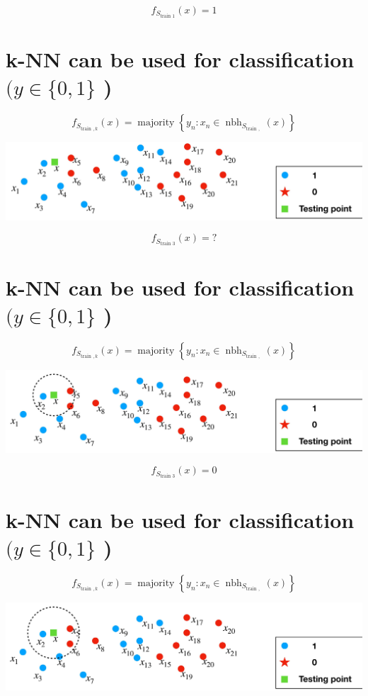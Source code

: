 \documentclass[10pt]{article}
\begin{document}
$$
f_{S_{\text {train } 1}}(x)=1
$$

\section*{k-NN can be used for classification $(y \in\{0,1\}$ )}
$$
f_{S_{\text {train }, k}}(x)=\operatorname{majority}\left\{y_{n}: x_{n} \in \operatorname{nbh}_{S_{\text {train }, ~}}(x)\right\}
$$

\begin{center}
\includegraphics[max width=\textwidth]{2023_12_30_f937b0007b5d87b39f79g-17}
\end{center}

$$
f_{S_{\text {train } 3}}(x)=?
$$

\section*{k-NN can be used for classification $(y \in\{0,1\}$ )}
$$
f_{S_{\text {train }, k}}(x)=\operatorname{majority}\left\{y_{n}: x_{n} \in \operatorname{nbh}_{S_{\text {train }, ~}}(x)\right\}
$$

\begin{center}
\includegraphics[max width=\textwidth]{2023_12_30_f937b0007b5d87b39f79g-18}
\end{center}

$$
f_{S_{\text {train } 3}}(x)=0
$$

\section*{k-NN can be used for classification $(y \in\{0,1\}$ )}
$$
f_{S_{\text {train }, k}}(x)=\operatorname{majority}\left\{y_{n}: x_{n} \in \operatorname{nbh}_{S_{\text {train }, ~}}(x)\right\}
$$

\begin{center}
\includegraphics[max width=\textwidth]{2023_12_30_f937b0007b5d87b39f79g-19}
\end{center}
\end{document}
